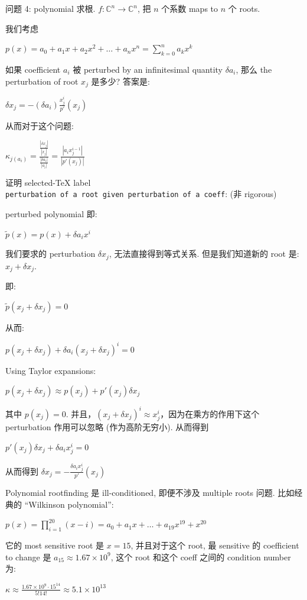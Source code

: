 \begin{example}

问题 4: polynomial 求根. \(f:\mathbb{C}^{n}\rightarrow\mathbb{C}^{n}\), 把 \(n\) 个系数 maps to \(n\) 个 roots.

我们考虑

\(p(x) = a_{0} + a_{1}x + a_{2}x^{2} + \ldots + a_{n}x^{n} = \sum_{k = 0}^{n}a_{k}x^{k}\)

如果 coefficient \(a_{i}\) 被 perturbed by an infinitesimal quantity \(\delta a_{i}\), 那么 the perturbation of root \(x_{j}\) 是多少? 答案是:

\(\delta x_{j} = - \left( {\delta a_{i}} \right)\frac{x_{j}^{i}}{p'}\left( x_{j} \right)\)

从而对于这个问题:

\(\kappa_{j{(a_{i})}} = \frac{\frac{\left| {\delta x_{j}} \right|}{\left| x_{j} \right|}}{\frac{\left| {\delta a_{i}} \right|}{\left| a_{i} \right|}} = \frac{\left| {a_{i}x_{j}^{i - 1}} \right|}{\left| {p'\left( x_{j} \right)} \right|}\)

证明 selected-TeX label \texttt{perturbation\ of\ a\ root\ given\ perturbation\ of\ a\ coeff}: (非 rigorous)

perturbed polynomial 即:

\(\widetilde{p}(x) = p(x) + \delta a_{i}x^{i}\)

我们要求的 perturbation \(\delta x_{j}\), 无法直接得到等式关系. 但是我们知道新的 root 是: \(x_{j} + \delta x_{j}\).

即:

\(\widetilde{p}\left( {x_{j} + \delta x_{j}} \right) = 0\)

从而:

\(p\left( {x_{j} + \delta x_{j}} \right) + \delta a_{i}\left( {x_{j} + \delta x_{j}} \right)^{i} = 0\)

Using Taylor expansions:

\(p\left( {x_{j} + \delta x_{j}} \right) \approx p\left( x_{j} \right) + p'\left( x_{j} \right)\delta x_{j}\)

其中 \(p\left( x_{j} \right) = 0\). 并且，\(\left( {x_{j} + \delta x_{j}} \right)^{i} \approx x_{j}^{i}\)，因为在乘方的作用下这个 perturbation 作用可以忽略 (作为高阶无穷小). 从而得到

\(p'\left( x_{j} \right)\delta x_{j} + \delta a_{i}x_{j}^{i} = 0\)

从而得到 \(\delta x_{j} = - \frac{\delta a_{i}x_{j}^{i}}{p'}\left( x_{j} \right)\)

Polynomial rootfinding 是 ill-conditioned, 即便不涉及 multiple roots 问题. 比如经典的 ``Wilkinson polynomial'':

\(p(x) = \prod_{i = 1}^{20}\left( {x - i} \right) = a_{0} + a_{1}x + \ldots + a_{19}x^{19} + x^{20}\)

它的 most sensitive root 是 \(x = 15\), 并且对于这个 root, 最 sensitive 的 coefficient to change 是 \(a_{15} \approx 1.67 \times 10^{9}\), 这个 root 和这个 coeff 之间的 condition number 为:

\(\kappa \approx \frac{1.67 \times 10^{9} \cdot 15^{14}}{5!14!} \approx 5.1 \times 10^{13}\)

\end{example}


